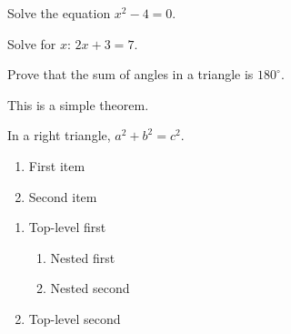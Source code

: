 \documentclass{article}
\begin{document}
\begin{exercice}
Solve the equation $x^2 - 4 = 0$.
\end{exercice}

\begin{exercice}[Algebra]
Solve for $x$: $2x + 3 = 7$.
\end{exercice}

\begin{exercice}[Geometry][10]
Prove that the sum of angles in a triangle is $180^\circ$.
\end{exercice}

\begin{theorem}
This is a simple theorem.
\end{theorem}

\begin{theorem}
In a right triangle, $a^2 + b^2 = c^2$.
\end{theorem}

\begin{enumerate}
\item First item
\item Second item
\end{enumerate}

\begin{enumerate}
\item Top-level first
\begin{enumerate}
\item Nested first
\item Nested second
\end{enumerate}
\item Top-level second
\end{enumerate}
\end{document}
